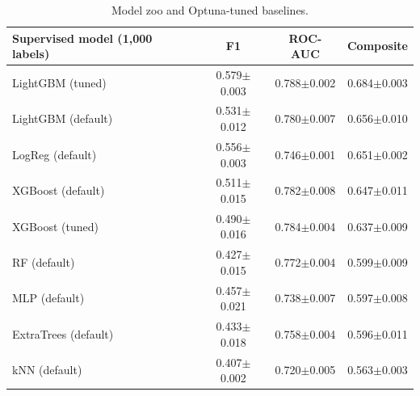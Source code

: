 \begin{table}[H]
\centering\small
\begin{tabular}{lccc}
\toprule
Supervised model (1,000 labels) & F1 & ROC-AUC & Composite\\
\midrule
LightGBM (tuned) & 0.579$\pm$0.003 & 0.788$\pm$0.002 & 0.684$\pm$0.003 \\
LightGBM (default) & 0.531$\pm$0.012 & 0.780$\pm$0.007 & 0.656$\pm$0.010 \\
LogReg (default) & 0.556$\pm$0.003 & 0.746$\pm$0.001 & 0.651$\pm$0.002 \\
XGBoost (default) & 0.511$\pm$0.015 & 0.782$\pm$0.008 & 0.647$\pm$0.011 \\
XGBoost (tuned) & 0.490$\pm$0.016 & 0.784$\pm$0.004 & 0.637$\pm$0.009 \\
RF (default) & 0.427$\pm$0.015 & 0.772$\pm$0.004 & 0.599$\pm$0.009 \\
MLP (default) & 0.457$\pm$0.021 & 0.738$\pm$0.007 & 0.597$\pm$0.008 \\
ExtraTrees (default) & 0.433$\pm$0.018 & 0.758$\pm$0.004 & 0.596$\pm$0.011 \\
kNN (default) & 0.407$\pm$0.002 & 0.720$\pm$0.005 & 0.563$\pm$0.003 \\
\bottomrule
\end{tabular}
\caption*{Model zoo and Optuna-tuned baselines.}
\end{table}
